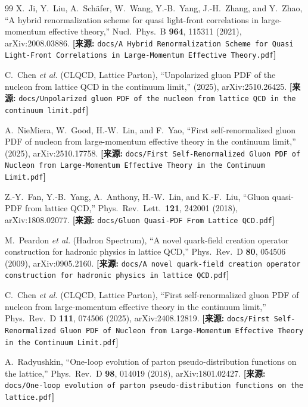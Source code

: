 \documentclass[12pt,a4paper]{ctexart}
\theoremstyle{definition}
\begin{document}
\begin{thebibliography}{99}
X.~Ji, Y.~Liu, A.~Sch\"afer, W.~Wang, Y.-B.~Yang, J.-H.~Zhang, and Y.~Zhao,
``A hybrid renormalization scheme for quasi light-front correlations in large-momentum effective theory,''
Nucl.\ Phys.\ B \textbf{964}, 115311 (2021), arXiv:2008.03886.
\quad\textbf{[来源:} \texttt{docs/A Hybrid Renormalization Scheme for Quasi Light-Front Correlations in Large-Momentum Effective Theory.pdf}\textbf{]}

C.~Chen \textit{et al.} (CLQCD, Lattice Parton),
``Unpolarized gluon PDF of the nucleon from lattice QCD in the continuum limit,''
(2025), arXiv:2510.26425.
\quad\textbf{[来源:} \texttt{docs/Unpolarized gluon PDF of the nucleon from lattice QCD in the continuum limit.pdf}\textbf{]}

A.~NieMiera, W.~Good, H.-W.~Lin, and F.~Yao,
``First self-renormalized gluon PDF of nucleon from large-momentum effective theory in the continuum limit,''
(2025), arXiv:2510.17758.
\quad\textbf{[来源:} \texttt{docs/First Self-Renormalized Gluon PDF of Nucleon from Large-Momentum Effective Theory in the Continuum Limit.pdf}\textbf{]}

Z.-Y.~Fan, Y.-B.~Yang, A.~Anthony, H.-W.~Lin, and K.-F.~Liu,
``Gluon quasi-PDF from lattice QCD,''
Phys.\ Rev.\ Lett.\ \textbf{121}, 242001 (2018), arXiv:1808.02077.
\quad\textbf{[来源:} \texttt{docs/Gluon Quasi-PDF From Lattice QCD.pdf}\textbf{]}

M.~Peardon \textit{et al.} (Hadron Spectrum),
``A novel quark-field creation operator construction for hadronic physics in lattice QCD,''
Phys.\ Rev.\ D \textbf{80}, 054506 (2009), arXiv:0905.2160.
\quad\textbf{[来源:} \texttt{docs/A novel quark-field creation operator construction for hadronic physics in lattice QCD.pdf}\textbf{]}

C.~Chen \textit{et al.} (CLQCD, Lattice Parton),
``First self-renormalized gluon PDF of nucleon from large-momentum effective theory in the continuum limit,''
Phys.\ Rev.\ D \textbf{111}, 074506 (2025), arXiv:2408.12819.
\quad\textbf{[来源:} \texttt{docs/First Self-Renormalized Gluon PDF of Nucleon from Large-Momentum Effective Theory in the Continuum Limit.pdf}\textbf{]}

A.~Radyushkin,
``One-loop evolution of parton pseudo-distribution functions on the lattice,''
Phys.\ Rev.\ D \textbf{98}, 014019 (2018), arXiv:1801.02427.
\quad\textbf{[来源:} \texttt{docs/One-loop evolution of parton pseudo-distribution functions on the lattice.pdf}\textbf{]}


\end{thebibliography}
\end{document}

